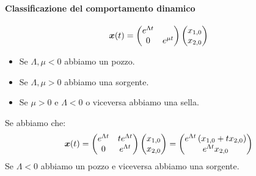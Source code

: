 \paragraph{Classificazione del comportamento dinamico}%
\label{par:Classificazione del comportamento dinamico}
\begin{exmp}[1]
    \[
	\boldsymbol{x} (t) = \begin{pmatrix} e^{\Lambda t} & \\ 0 & e^{\mu t} \end{pmatrix} \begin{pmatrix} x_{1,0} \\ x_{2, 0} \end{pmatrix} 
    \] 
    \begin{itemize}
        \item  Se $\Lambda, \mu  < 0 $ abbiamo un pozzo.
	\item Se $\Lambda, \mu  >0 $ abbiamo una sorgente.
	\item Se $\mu >0$ e $\Lambda  < 0 $ o viceversa abbiamo una sella.
    \end{itemize}
   
\end{exmp}
\noindent
\begin{exmp}[2]
    Se abbiamo che:
    \[
	\boldsymbol{x} (t) = \begin{pmatrix} e^{\Lambda t}  & t e^{\Lambda t} \\ 0 & e^{\Lambda t} \end{pmatrix} \begin{pmatrix} x_{1,0} \\ x_{2, 0} \end{pmatrix} = \begin{pmatrix} e^{\Lambda t}\left(x_{1, 0} + t x_{2,0}\right) \\ e^{\Lambda t}x_{2, 0} \end{pmatrix} 
    \] 
    Se $\Lambda <0$ abbiamo un pozzo e viceversa abbiamo una sorgente.
\end{exmp}
\noindent
